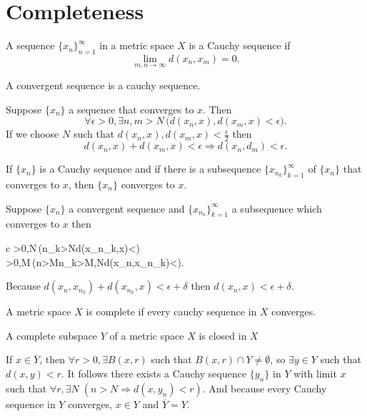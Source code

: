 \documentclass[nobib,notoc]{tufte-handout}
\begin{document}
\section{Completeness}
\begin{defi}
	A sequence \(\{x_n\}_{n=1}^{\infty}\) in a metric space \(X\) is a Cauchy sequence if
	\begin{equation*}
		\lim_{m,n\rightarrow\infty}d(x_n,x_m)=0.
	\end{equation*}
\end{defi}
\begin{lem}
	A convergent sequence is a cauchy sequence.
	\begin{IEEEproof}
		Suppose \(\{x_n\}\) a sequence that converges to \(x\). Then
		\begin{equation*}
			\forall\epsilon>0,\exists n,m>N\,\big(d(x_n,x),d(x_m,x)<\epsilon\big).
		\end{equation*}
		If we choose \(N\) such that \(d(x_n,x),d(x_m,x)<\frac{\epsilon}{2}\) then
		\begin{equation*}
			d(x_n,x)+d(x_m,x)<\epsilon\Rightarrow d(x_n,d_m)<\epsilon.
		\end{equation*}
	\end{IEEEproof}
\end{lem}
\begin{lem}
	If \(\{x_n\}\) is a Cauchy sequence and if there is a subsequence \(\{x_{n_k}\}_{k=1}^{\infty}\) of \(\{x_n\}\) that converges to \(x\), then \(\{x_n\}\) converges to \(x\).
	\begin{IEEEproof}
		Suppose \(\{x_n\}\) a convergent sequence and \(\{x_{n_k}\}_{k=1}^{\infty}\) a subsequence which converges to \(x\) then
		\begin{IEEEeqnarray*}{c}
			\forall\delta>0,\exists N\,(n_k>N\Rightarrow d(x_{n_k},x)<\delta)\\
			\forall\epsilon>0,\exists M\,(n>M\wedge n_k>M,N\Rightarrow d(x_n,x_{n_k})<\epsilon).
		\end{IEEEeqnarray*}
		Because \(d(x_n,x_{n_k})+d(x_{n_k},x)<\epsilon+\delta\) then \(d(x_n,x)<\epsilon+\delta\).
	\end{IEEEproof}
\end{lem}
\begin{defi}
	A metric space \(X\) is complete if every cauchy sequence in \(X\) converges.
\end{defi}
\begin{thm}
	A complete subspace \(Y\) of a metric space \(X\) is closed in \(X\)
	\begin{IEEEproof}
		If \(x\in\overline{Y}\), then \(\forall r>0,\exists B(x,r)\) such that \(B(x,r)\cap Y\neq\emptyset\), so \(\exists y\in Y\) such that \(d(x,y)<r\). It follows there exists a Cauchy sequence \(\{y_n\}\) in \(Y\) with limit \(x\) such that \(\forall r,\exists N\;(n>N\Rightarrow d(x,y_n)<r)\). And because every Cauchy sequence in \(Y\) converges, \(x\in Y\) and \(\overline{Y}=Y\).
	\end{IEEEproof}
\end{thm}
\end{document}
